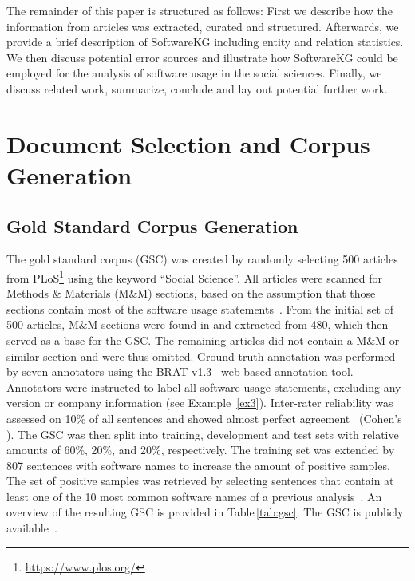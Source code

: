 \documentclass[runningheads]{llncs}
\newcommand{\tabref}[1]{Table\,\ref{#1}}
\begin{document}
The remainder of this paper is structured as follows: 
First we describe how the information from articles was extracted, curated and structured. 
Afterwards, we provide a brief description of SoftwareKG including entity and relation statistics. 
We then discuss potential error sources and illustrate how SoftwareKG could be employed for the analysis of software usage in the social sciences.
Finally, we discuss related work, summarize, conclude and lay out potential further work.  

\section{Document Selection and Corpus Generation}

\subsection{Gold Standard Corpus Generation}\label{sec:gsc}
The gold standard corpus (GSC) was created by randomly selecting 500 articles from PLoS\footnote{\url{https://www.plos.org/}} using the keyword ``Social Science''.
All articles were scanned for Methods \& Materials (M\&M) sections, based on the assumption that those sections contain most of the software usage statements~\cite{duck2013bionerds}.
From the initial set of 500 articles, M\&M sections were found in and extracted from 480, which then served as a base for the GSC.
The remaining articles did not contain a M\&M or similar section and were thus omitted.
Ground truth annotation was performed by seven annotators using the BRAT v1.3~\cite{stenetorp2012brat} web based annotation tool.
Annotators were instructed to label all software usage statements, excluding any version or company information (see Example~\ref{ex3}).
Inter-rater reliability was assessed on 10\% of all sentences and showed almost perfect agreement~\cite{landis1977measurement} (Cohen's ).
The GSC was then split into training, development and test sets with relative amounts of 60\%, 20\%, and 20\%, respectively.
The training set was extended by 807 sentences with software names to increase the amount of positive samples.
The set of positive samples was retrieved by selecting sentences that contain at least one of the 10 most common software names of a previous analysis~\cite{duck2013bionerds}.
An overview of the resulting GSC is provided in \tabref{tab:gsc}. 
The GSC is publicly available~\cite{Schindler_softwarekg_2020}.
\end{document}
